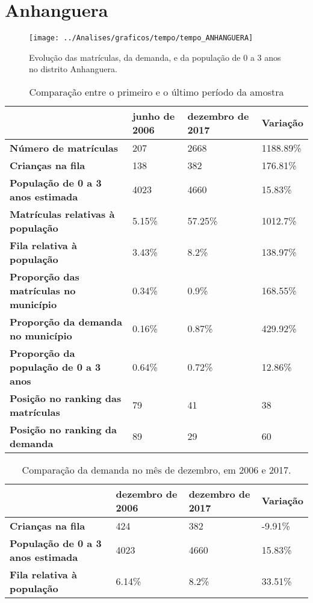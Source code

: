 \section{Anhanguera}
\begin{figure}[H]
\centering
\texttt{[image: ../Analises/graficos/tempo/tempo\_ANHANGUERA]}
\caption{Evolução das matrículas, da demanda, e da população de 0 a 3 anos no distrito Anhanguera.}
\end{figure}
\begin{table}[H]
\begin{tabular}{|l|l|l|l|}
\hline
\textbf{}                                      & \textbf{junho de 2006}       & \textbf{dezembro de 2017}    & \textbf{Variação} \\ \hline
\textbf{Número de matrículas}                  & 207 & 2668 & 1188.89\% \\ \hline
\textbf{Crianças na fila}                      & 138 & 382 & 176.81\% \\ \hline
\textbf{População de 0 a 3 anos estimada}      & 4023 & 4660 & 15.83\% \\ \hline
\textbf{Matrículas relativas à população}      & 5.15\% & 57.25\% & 1012.7\% \\ \hline
\textbf{Fila relativa à população}             & 3.43\% & 8.2\% & 138.97\% \\ \hline
\textbf{Proporção das matrículas no município} & 0.34\% & 0.9\% & 168.55\% \\ \hline
\textbf{Proporção da demanda no município}     & 0.16\% & 0.87\% & 429.92\% \\ \hline
\textbf{Proporção da população de 0 a 3 anos}  & 0.64\% & 0.72\% & 12.86\% \\ \hline
\textbf{Posição no ranking das matrículas}     & 79 & 41 & 38 \\ \hline
\textbf{Posição no ranking da demanda}         & 89 & 29 & 60 \\ \hline
\end{tabular}
\caption{Comparação entre o primeiro e o último período da amostra}
\end{table}
\begin{table}[H]
\begin{tabular}{|l|l|l|l|}
\hline
\textbf{}                                 & \textbf{dezembro de 2006} & \textbf{dezembro de 2017} & \textbf{Variação} \\ \hline
\textbf{Crianças na fila}                      & 424 & 382 & -9.91\% \\ \hline
\textbf{População de 0 a 3 anos estimada}      & 4023 & 4660 & 15.83\% \\ \hline
\textbf{Fila relativa à população}             & 6.14\% & 8.2\% & 33.51\% \\ \hline
\end{tabular}
\caption{Comparação da demanda no mês de dezembro, em 2006 e 2017.}
\end{table}
